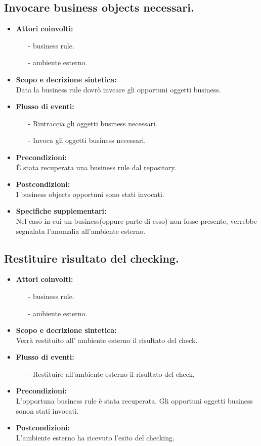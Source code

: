 \documentclass[11pt,titlepage,a4paper]{report}
\begin{document}
\subsection{Invocare business objects necessari.}
\begin{itemize}
\item{\textbf{Attori coinvolti:}}
\begin{itemize}
\item[-] business rule.
\item[-] ambiente esterno.
\end{itemize}
\item{\textbf{Scopo e decrizione sintetica:}}\\
Data la business rule dovr\`o invcare gli opportuni oggetti business.
\item{\textbf{Flusso di eventi:}}
\begin{itemize}
 \item[-] {Rintraccia gli oggetti business necessari.}
 \item[-] {Invoca gli oggetti business necessari.}
\end{itemize}
\item{\textbf{Precondizioni:}}\\
\`E stata recuperata una business rule dal repository.
\item{\textbf{Postcondizioni:}}\\
I business objects opportuni sono stati invocati.
\item\textbf{{Specifiche supplementari:}}\\
Nel caso in cui un business(oppure parte di esso) non fosse presente, verrebbe segnalata l'anomalia all'ambiente esterno.
\end{itemize}
\subsection{Restituire risultato del checking.}
\begin{itemize}
\item{\textbf{Attori coinvolti:}}
\begin{itemize}
\item[-] business rule.
\item[-] ambiente esterno.
\end{itemize}
\item{\textbf{Scopo e decrizione sintetica:}}\\
Verr\`a restituito all' ambiente esterno il risultato del check.
\item{\textbf{Flusso di eventi:}}
\begin{itemize}
 \item[-] {Restituire all'ambiente esterno il risultato del check.}
\end{itemize}
\item{\textbf{Precondizioni:}}\\
L'opportuna business rule \`e stata recuperata.
Gli opportuni oggetti business sonon stati invocati.
\item{\textbf{Postcondizioni:}}\\
L'ambiente esterno ha ricevuto l'esito del checking.

\end{itemize}
\end{document}
